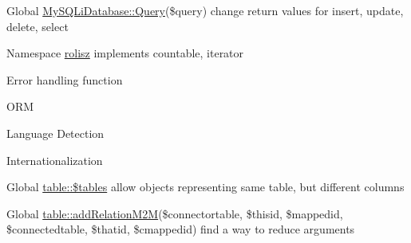 \label{todo__todo000002}
\hypertarget{todo__todo000002}{}
 
\begin{DoxyDescription}
\item[Global \hyperlink{class_my_s_q_li_database_aebc962126fd37fd3478c4689156d5f83}{MySQLiDatabase::Query}(\$query) ]change return values for insert, update, delete, select 
\end{DoxyDescription}

\label{todo__todo000001}
\hypertarget{todo__todo000001}{}
 
\begin{DoxyDescription}
\item[Namespace \hyperlink{namespacerolisz}{rolisz} ]implements countable, iterator 

Error handling function 

ORM 

Language Detection 

Internationalization 
\end{DoxyDescription}

\label{todo__todo000003}
\hypertarget{todo__todo000003}{}
 
\begin{DoxyDescription}
\item[Global \hyperlink{classtable_a3d332a3c374a53802495dcb045f6133f}{table::\$tables} ]allow objects representing same table, but different columns 
\end{DoxyDescription}

\label{todo__todo000004}
\hypertarget{todo__todo000004}{}
 
\begin{DoxyDescription}
\item[Global \hyperlink{classtable_a29c2012e7cc6b182cc3ca63acfc324b9}{table::addRelationM2M}(\$connectortable, \$thisid, \$mappedid, \$connectedtable, \$thatid, \$cmappedid) ]find a way to reduce arguments
\end{DoxyDescription}